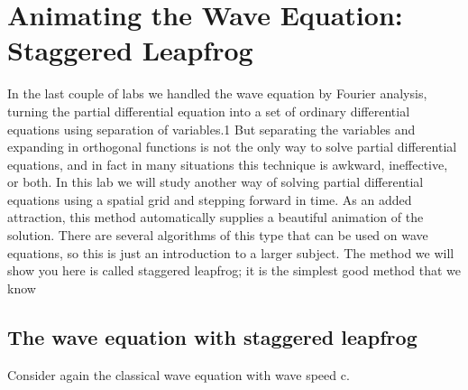 \documentclass{book}
\theoremstyle{plain}
\theoremstyle{definition}
\numberwithin{exm}{chapter}
\theoremstyle{remark}
\theoremstyle{summary}
\theoremstyle{overview}
\begin{document}
\chapter*{Animating the Wave Equation: Staggered Leapfrog}
In the last couple of labs we handled the wave equation by Fourier analysis,
turning the partial differential equation into a set of ordinary differential equations using separation of variables.1 But separating the variables and expanding
in orthogonal functions is not the only way to solve partial differential equations,
and in fact in many situations this technique is awkward, ineffective, or both. In
this lab we will study another way of solving partial differential equations using a
spatial grid and stepping forward in time. As an added attraction, this method
automatically supplies a beautiful animation of the solution. There are several
algorithms of this type that can be used on wave equations, so this is just an
introduction to a larger subject. The method we will show you here is called
staggered leapfrog; it is the simplest good method that we know


\section*{The wave equation with staggered leapfrog}
Consider again the classical wave equation with wave speed c.
\end{document}
